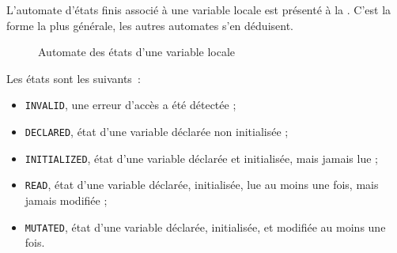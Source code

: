 L'automate d'états finis associé à une variable locale est présenté à la . C'est la forme la plus générale, les autres automates s'en déduisent.


\begin{figure}[ht!]
  \centering
  \small
  \caption{Automate des états d'une variable locale}
\end{figure}



Les états sont les suivants~:
\begin{itemize}
  \item \texttt{INVALID}, une erreur d'accès a été détectée ; 
  \item \texttt{DECLARED}, état d'une variable déclarée non initialisée ;
  \item \texttt{INITIALIZED}, état d'une variable déclarée et initialisée, mais jamais lue ;
  \item \texttt{READ}, état d'une variable déclarée, initialisée, lue au moins une fois, mais jamais modifiée ;
  \item \texttt{MUTATED}, état d'une variable déclarée, initialisée, et modifiée au moins une fois.
\end{itemize}

